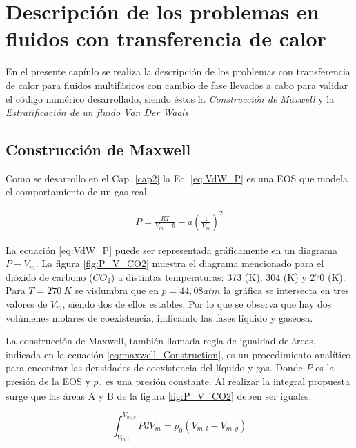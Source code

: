 \chapter{Descripción de los problemas en fluidos con transferencia de calor }
\graphicspath{{figs/cap4/}}
\label{cap4}

En el presente capíulo se realiza la descripción de los problemas con transferencia de calor para fluidos multifásicos con cambio de fase llevados a cabo para validar el código numérico desarrollado, siendo éstos la \textit{Construcción de Maxwell} y la \textit{Estratificación de un fluido Van Der Waals}

\section{Construcción de Maxwell}

Como se desarrollo en el Cap. \ref{cap2} la Ec. \ref{eq:VdW_P} es una EOS que modela el comportamiento de un gas real.

\begin{align}
P = \frac{R T}{V_m - b} - a {(\frac{1}{V_m})}^2
\label{eq:VdW_P}
\end{align}

La ecuación \ref{eq:VdW_P} puede ser representada gráficamente en un diagrama $P - V_m$. La figura \ref{fig:P_V_CO2} muestra el diagrama mencionado para el dióxido de carbono ($CO_2$) a distintas temperaturas: 373 (K), 304 (K) y 270 (K). Para $T = 270 \> K$ se vislumbra que en $p = 44,08 atm$ la gráfica se intersecta en tres valores de $V_m$, siendo dos de ellos estables. Por lo que se observa que hay dos volúmenes molares de coexistencia, indicando las fases líquido y gaseosa.

La construcción de Maxwell, también llamada regla de igualdad de áreas, indicada en la ecuación \ref{eq:maxwell_Construction}, es un procedimiento analítico para encontrar las densidades de coexistencia del líquido y gas. Donde $P$ es la presión de la EOS y $p_0$ es una presión constante. Al realizar la integral propuesta surge que las áreas A y B de la figura \ref{fig:P_V_CO2} deben ser iguales.

\begin{equation}
\int_{V_{m,l}}^{V_{m,g}} P d V_m = p_0 (V_{m,l} -  V_{m,g})
\label{eq:maxwell_Construction}
\end{equation}

